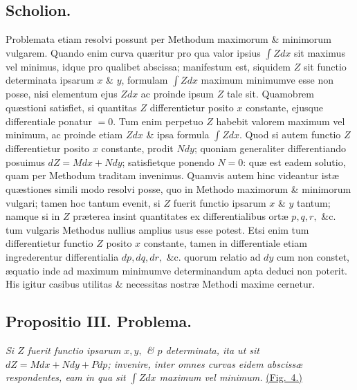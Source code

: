 \subsection*{Scholion.}
Problemata etiam resolvi possunt per Methodum maximorum \& minimorum vulgarem. Quando enim curva quæritur pro qua valor ipsius $\int Zdx$ sit maximus vel minimus, idque pro qualibet abscissa; manifestum est, siquidem $Z$ sit functio determinata ipsarum $x$ \& $y$, formulam $\int Zdx$ maximum minimumve esse non posse, nisi elementum ejus $Zdx$ ac proinde ipsum $Z$ tale sit. Quamobrem quæstioni satisfiet, si quantitas $Z$ differentietur posito $x$ constante, ejusque differentiale ponatur $=0$. Tum enim perpetuo $Z$ habebit valorem maximum vel minimum, ac proinde etiam $Zdx$ \& ipsa formula $\int Zdx$. Quod si autem functio $Z$ differentietur posito $x$ constante, prodit $Ndy$; quoniam generaliter differentiando posuimus $dZ=Mdx+Ndy$; satisfietque ponendo $N=0$: quæ est eadem solutio, quam per Methodum traditam invenimus. Quamvis autem hinc videantur istæ quæstiones simili modo resolvi posse, quo in Methodo maximorum \& minimorum vulgari; tamen hoc tantum evenit, si $Z$ fuerit functio ipsarum $x$ \& $y$ tantum; namque si in $Z$ præterea insint quantitates ex differentialibus ortæ $p,q,r,$ \&c. tum vulgaris Methodus nullius amplius usus esse potest. Etsi enim tum differentietur functio $Z$ posito $x$ constante, tamen in differentiale etiam ingrederentur differentialia $dp,dq,dr,$ \&c. quorum relatio ad $dy$ cum non constet, æquatio inde ad maximum minimumve determinandum apta deduci non poterit. His igitur casibus utilitas \& necessitas nostræ Methodi maxime cernetur.

\subsection*{Propositio III. Problema.}
\textit{Si $Z$ fuerit functio ipsarum $x,y,$ \& $p$ determinata, ita ut sit $dZ=Mdx+Ndy+Pdp$; invenire, inter omnes curvas eidem abscissæ respondentes, eam in qua sit $\int Zdx$ maximum vel minimum.} \hyperlink{fig:4}{(Fig.~4.)}

